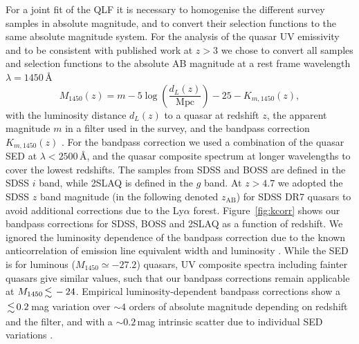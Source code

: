 \documentclass[fleqn,usenatbib]{mnras}
\begin{document}
For a joint fit of the QLF it is necessary to homogenise the different
survey samples in absolute magnitude, and to convert their selection
functions to the same absolute magnitude system. For the analysis of
the quasar UV emissivity and to be consistent with published work at
$z>3$ we chose to convert all samples and selection functions to the
absolute AB magnitude at a rest frame wavelength $\lambda=1450$\,\AA
\begin{equation}\label{eq:absmag}
  M_{1450}\left(z\right) = m-5\log{\left(\frac{d_L\left(z\right)}{\mathrm{Mpc}}\right)}-25-K_{m,1450}\left(z\right),
\end{equation}
with the luminosity distance $d_L\left(z\right)$ to a quasar at
redshift $z$, the apparent magnitude $m$ in a filter used in the
survey, and the bandpass correction $K_{m,1450}\left(z\right)$
\citep{1956AJ.....61...97H, 1968ApJ...154...21O, 2000A&A...353..861W,
  2002astro.ph.10394H}. For the bandpass correction we used a
combination of the \citet{2015MNRAS.449.4204L} quasar SED at
$\lambda<2500$\,\AA, and the \citet{2001AJ....122..549V} quasar
composite spectrum at longer wavelengths to cover the lowest
redshifts.  The samples from SDSS and BOSS are defined in the SDSS $i$
band, while 2SLAQ is defined in the $g$ band. At $z>4.7$ we adopted
the SDSS $z$ band magnitude (in the following denoted $z_\mathrm{AB}$)
for SDSS DR7 quasars to avoid additional corrections due to the
Ly$\alpha$ forest. Figure~\ref{fig:kcorr} shows our bandpass
corrections for SDSS, BOSS and 2SLAQ as a function of redshift. We
ignored the luminosity dependence of the bandpass correction due to
the known anticorrelation of emission line equivalent width and
luminosity \citep{1977ApJ...214..679B}.  While the
\citet{2015MNRAS.449.4204L} SED is for luminous ($M_{1450}\simeq
-27.2$) quasars, UV composite spectra including fainter quasars
\citep{2002ApJ...565..773T, 2012ApJ...752..162S, 2014ApJ...794...75S}
give similar values, such that our bandpass corrections remain
applicable at $M_{1450}\la -24$. Empirical luminosity-dependent
bandpass corrections show a $\la 0.2$\,mag variation over $\sim 4$
orders of absolute magnitude depending on redshift and the filter, and
with a $\sim 0.2$\,mag intrinsic scatter due to individual SED
variations \citep{2013ApJ...773...14R, 2013ApJ...768..105M,
  2013A&A...551A..29P}.
\end{document}

